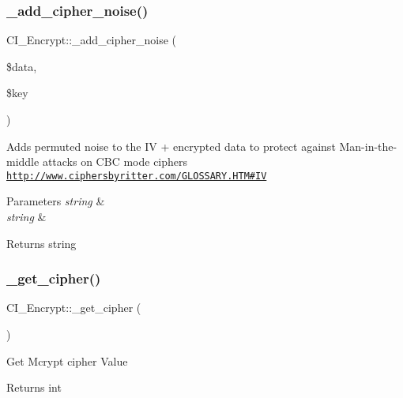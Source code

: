 \subsubsection{\texorpdfstring{\+\_\+add\+\_\+cipher\+\_\+noise()}{\_add\_cipher\_noise()}}
{\footnotesize\ttfamily C\+I\+\_\+\+Encrypt\+::\+\_\+add\+\_\+cipher\+\_\+noise (\begin{DoxyParamCaption}\item[{}]{\$data,  }\item[{}]{\$key }\end{DoxyParamCaption})\hspace{0.3cm}{\ttfamily [protected]}}

Adds permuted noise to the IV + encrypted data to protect against Man-\/in-\/the-\/middle attacks on C\+BC mode ciphers \href{http://www.ciphersbyritter.com/GLOSSARY.HTM#IV}{\tt http\+://www.\+ciphersbyritter.\+com/\+G\+L\+O\+S\+S\+A\+R\+Y.\+H\+T\+M\#\+IV}


\begin{DoxyParams}{Parameters}
{\em string} & \\
\hline
{\em string} & \\
\hline
\end{DoxyParams}
\begin{DoxyReturn}{Returns}
string 
\end{DoxyReturn}
\mbox{\label{class_c_i___encrypt_a2795b333a493ae69ecad8aad47525a32}} 
\subsubsection{\texorpdfstring{\+\_\+get\+\_\+cipher()}{\_get\_cipher()}}
{\footnotesize\ttfamily C\+I\+\_\+\+Encrypt\+::\+\_\+get\+\_\+cipher (\begin{DoxyParamCaption}{ }\end{DoxyParamCaption})\hspace{0.3cm}{\ttfamily [protected]}}

Get Mcrypt cipher Value

\begin{DoxyReturn}{Returns}
int 
\end{DoxyReturn}
\mbox{\label{class_c_i___encrypt_adf5eee858f240523b9ba1602cfd06f5a}} 
